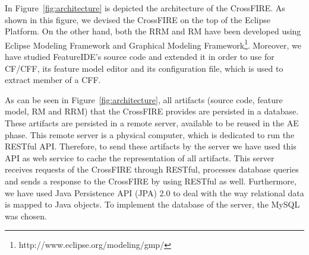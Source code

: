 
In Figure~\ref{fig:architecture} is depicted the architecture of the CrossFIRE. As shown in this figure, we devised the CrossFIRE on the top of the Eclipse Platform. On the other hand, both the RRM and RM have been developed using Eclipse Modeling Framework and Graphical Modeling Framework\footnote{http://www.eclipse.org/modeling/gmp/}. Moreover, we have studied FeatureIDE's source code and extended it in order to use for CF/CFF, its feature model editor and its configuration file, which is used to extract member of a CFF.


As can be seen in Figure~\ref{fig:architecture}, all artifacts (source code, feature model, RM and RRM) that the CrossFIRE provides are persisted in a database. These artifacts are persisted in a remote server, available to be reused in the AE phase. This remote server is a physical computer, which is dedicated to run the RESTful API. Therefore, to send these artifacts by the server we have used this API as web service to cache the representation of all artifacts. This server receives requests of the CrossFIRE through RESTful, processes database queries and sends a response to the CrossFIRE by using RESTful as well. Furthermore, we have used Java Persistence API (JPA) 2.0 to deal with the way relational data is mapped to Java objects. To implement the database of the server, the MySQL was chosen.


